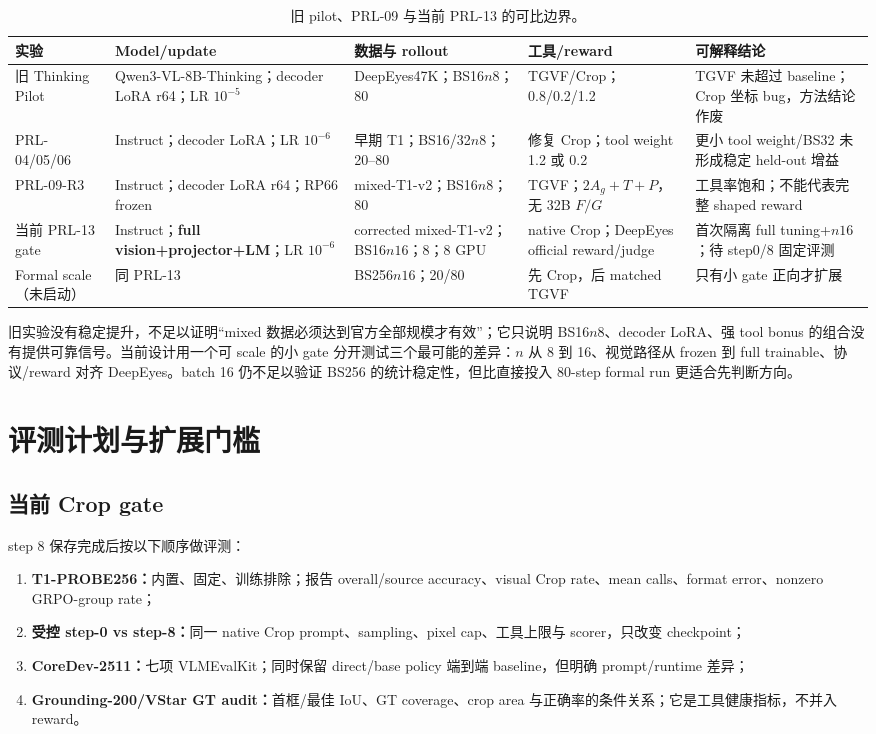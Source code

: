 \documentclass[UTF8,twocolumn,10pt,a4paper]{ctexart}
\begin{document}
\begin{table}[t]
\centering
\caption{旧 pilot、PRL-09 与当前 PRL-13 的可比边界。}
\label{tab:history}
\scriptsize
\begin{tabularx}{\textwidth}{lYYYY}
\toprule
实验 & Model/update & 数据与 rollout & 工具/reward & 可解释结论 \\
\midrule
旧 Thinking Pilot & Qwen3-VL-8B-Thinking；decoder LoRA r64；LR $10^{-5}$ & DeepEyes47K；BS16$n8$；80 & TGVF/Crop；0.8/0.2/1.2 & TGVF 未超过 baseline；Crop 坐标 bug，方法结论作废 \\
PRL-04/05/06 & Instruct；decoder LoRA；LR $10^{-6}$ & 早期 T1；BS16/32$n8$；20--80 & 修复 Crop；tool weight 1.2 或 0.2 & 更小 tool weight/BS32 未形成稳定 held-out 增益 \\
PRL-09-R3 & Instruct；decoder LoRA r64；RP66 frozen & mixed-T1-v2；BS16$n8$；80 & TGVF；$2A_g+T+P$，无 32B $F/G$ & 工具率饱和；不能代表完整 shaped reward \\
当前 PRL-13 gate & Instruct；\textbf{full vision+projector+LM}；LR $10^{-6}$ & corrected mixed-T1-v2；BS16$n16$；8；8 GPU & native Crop；DeepEyes official reward/judge & 首次隔离 full tuning+$n16$；待 step0/8 固定评测 \\
Formal scale（未启动） & 同 PRL-13 & BS256$n16$；20/80 & 先 Crop，后 matched TGVF & 只有小 gate 正向才扩展 \\
\bottomrule
\end{tabularx}
\end{table}

旧实验没有稳定提升，不足以证明“mixed 数据必须达到官方全部规模才有效”；它只说明 BS16$n8$、decoder LoRA、强 tool bonus 的组合没有提供可靠信号。当前设计用一个可 scale 的小 gate 分开测试三个最可能的差异：$n$ 从 8 到 16、视觉路径从 frozen 到 full trainable、协议/reward 对齐 DeepEyes。batch 16 仍不足以验证 BS256 的统计稳定性，但比直接投入 80-step formal run 更适合先判断方向。

\section{评测计划与扩展门槛}

\subsection{当前 Crop gate}

step 8 保存完成后按以下顺序做评测：
\begin{enumerate}
  \item \textbf{T1-PROBE256：}内置、固定、训练排除；报告 overall/source accuracy、visual Crop rate、mean calls、format error、nonzero GRPO-group rate；
  \item \textbf{受控 step-0 vs step-8：}同一 native Crop prompt、sampling、pixel cap、工具上限与 scorer，只改变 checkpoint；
  \item \textbf{CoreDev-2511：}七项 VLMEvalKit；同时保留 direct/base policy 端到端 baseline，但明确 prompt/runtime 差异；
  \item \textbf{Grounding-200/VStar GT audit：}首框/最佳 IoU、GT coverage、crop area 与正确率的条件关系；它是工具健康指标，不并入 reward。
\end{enumerate}
\end{document}
